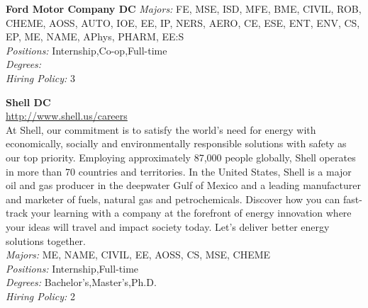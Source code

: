 \documentclass[twoside]{article}
\begin{document}
\begin{center}
\begin{multicols}{2}
\begin{minipage}{.95\columnwidth}{\Large\bf Ford Motor Company \hfill DC}
    \emph{Majors:} FE, MSE, ISD, MFE, BME, CIVIL, ROB, CHEME, AOSS, AUTO, IOE, EE, IP, NERS, AERO, CE, ESE, ENT, ENV, CS, EP, ME, NAME, APhys, PHARM, EE:S\\
    \emph{Positions:} Internship,Co-op,Full-time\\
    \emph{Degrees:} \\
    \emph{Hiring Policy:} 3\\
\end{minipage}
 \begin{minipage}{.95\columnwidth}{\Large\bf Shell \hfill DC}\\
    \url{http://www.shell.us/careers}\\
    At Shell, our commitment is to satisfy the world’s need for energy with economically, socially and environmentally responsible solutions with safety as our top priority. Employing approximately 87,000 people globally, Shell operates in more than 70 countries and territories. In the United States, Shell is a major oil and gas producer in the deepwater Gulf of Mexico and a leading manufacturer and marketer of fuels, natural gas and petrochemicals. Discover how you can fast-track your learning with a company at the forefront of energy innovation where your ideas will travel and impact society today. Let’s deliver better energy solutions together.\\
    \emph{Majors:} ME, NAME, CIVIL, EE, AOSS, CS, MSE, CHEME\\
    \emph{Positions:} Internship,Full-time\\
    \emph{Degrees:} Bachelor's,Master's,Ph.D.\\
    \emph{Hiring Policy:} 2\\
\end{minipage}
 \end{multicols}\end{center}
    \startcompanysection
\end{document}
